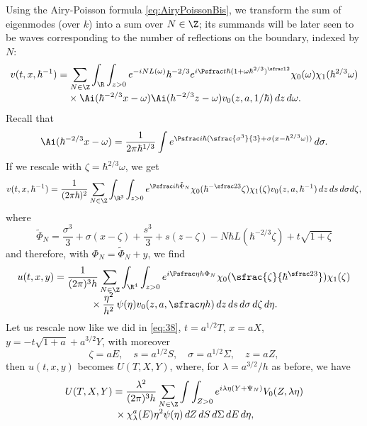 Using the Airy-Poisson formula \eqref{eq:AiryPoissonBis}, we transform the sum of eigenmodes (over $k$) into a sum over $N\in \Z$; its summands will be later seen to be waves corresponding to the number of reflections on the boundary, indexed by $N$:
\begin{multline*}
v(t,x,\hbar^{-1})= \sum_{N\in \Z} \int_{\R}\int_{{z}>0} e^{-i NL(\omega)} \hbar^{-2/3} e^{i\Psfrac t \hbar (1+\omega \hbar^{2/3})^{\sfrac 1 2}} \chi_{0}(\omega)\chi_{1}(\hbar^{2/3}\omega)\\[
-3pt]
{}\times\Ai(\hbar^{-2/3} x-\omega) \Ai(h^{-2/3}{z}-\omega) v_{0}({z},a,1/\hbar) \,d{z} \,d\omega.
\end{multline*}
Recall that
\begin{equation*}
\label{eq:47}
\Ai(\hbar^{-2/3} x-\omega)=\frac 1 {2\pi \hbar^{1/3} } \int e^{\Psfrac i \hbar (\sfrac{\sigma^{3}}{3}+\sigma(x-\hbar^{2/3}\omega))} \,d\sigma.
\end{equation*}
If we rescale with $\zeta=\hbar^{2/3} \omega$, we get
\begin{equation*}
\label{eq:48}
v(t,x,\hbar^{-1})
= \frac 1 {(2\pi\hbar)^{2}} \sum_{N\in \Z} \int_{\R^{3}}\int_{{z}>0} e^{\Psfrac i \hbar \tilde \Phi_{N}} \chi_{0}(\hbar^{-\sfrac 23}\zeta)\chi_{1}(\zeta) v_{0}({z},a,\hbar^{-1}) \,dz \,ds \,d\sigma d{\zeta},
\end{equation*}
where
\begin{equation*}
\label{eq:49}
\tilde \Phi_{N}=\frac{\sigma^{3}} 3+\sigma(x-\zeta)+\frac {s^{3}} 3+s({z}-\zeta)-N\hbar L(\hbar^{-2/3} \zeta)+t \sqrt{1+\zeta}
\end{equation*}
and therefore, with $\Phi_{N}=\tilde\Phi_{N}+y$, we find
\begin{multline*}
u(t,x,y)
= \frac 1 {(2\pi)^{3}h} \sum_{N\in \Z} \int_{\R^{4}}\int_{{z}>0}e^{i \Psfrac \eta h \Phi_{N}} \chi_{0}(\sfrac {\zeta} {\hbar^{\sfrac 23}})\chi_{1}(\zeta)\\[-5pt]
{}\times\frac {\eta^{2}} {h^{2}}\,{\psi(\eta)} v_{0}({z},a,\sfrac \eta h) \,dz \,ds \,d\sigma \,d\zeta \,d\eta.
\end{multline*}
Let us rescale now like we did in \eqref{eq:38}, $t=a^{1/2} T$, $x=aX$, $y=-t\sqrt{1+a}+a^{3/2}Y$, with moreover
\begin{equation*}
\label{eq:50}
\zeta=a E,\quad s=a^{1/2}S,\quad \sigma =a^{1/2} \Sigma,\quad {z}=a {Z},
\end{equation*}
then $u(t,x,y)$ becomes $U(T,X,Y)$, where, for $\lambda=a^{3/2}/h$ as before, we have
\begin{multline}
\label{eq:51}
U(T,X,Y)= \frac {\lambda^{2}} {(2\pi)^{3}h} \sum_{N\in \Z} \int \int_{Z>0} e^{i\lambda \eta (Y+\Psi_{N})}V_{0}({Z},\lambda \eta) \\[
-3pt]
 {}\times
\chi_{\lambda}^{a}(E) \eta^{2} \psi(\eta) \,dZ \,dS \,d\Sigma \,dE \,d\eta,
\end{multline}
